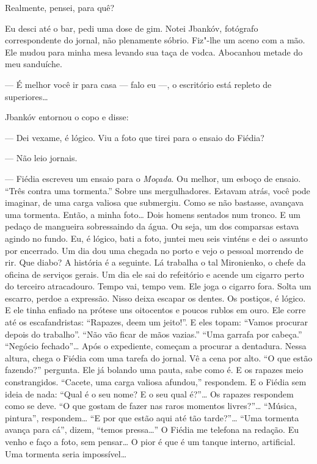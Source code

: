 Realmente, pensei, para quê?

Eu desci até o bar, pedi uma dose de gim. Notei Jbankóv, fotógrafo
correspondente do jornal, não plenamente sóbrio. Fiz"-lhe um aceno com a
mão. Ele mudou para minha mesa levando sua taça de vodca. Abocanhou
metade do meu sanduíche.

--- É melhor você ir para casa --- falo eu ---, o escritório está
repleto de superiores\ldots{}

Jbankóv entornou o copo e disse:

--- Dei vexame, é lógico. Viu a foto que tirei para o ensaio do Fiédia?

--- Não leio jornais.

--- Fiédia escreveu um ensaio para o \emph{Moçada}. Ou melhor, um esboço
de ensaio. ``Três contra uma tormenta.'' Sobre uns
mergulhadores. Estavam atrás, você pode imaginar, de uma carga valiosa
que submergiu. Como se não bastasse, avançava uma tormenta. Então, a
minha foto\ldots{} Dois homens sentados num tronco. E um pedaço de mangueira
sobressaindo da água. Ou seja, um dos comparsas estava agindo no fundo.
Eu, é lógico, bati a foto, juntei meu seis vinténs e dei o assunto por
encerrado. Um dia dou uma chegada no porto e vejo o pessoal morrendo de
rir. Que diabo? A história é a seguinte. Lá trabalha o tal Mironienko, o
chefe da oficina de serviços gerais. Um dia ele sai do refeitório e
acende um cigarro perto do terceiro atracadouro. Tempo vai, tempo vem.
Ele joga o cigarro fora. Solta um escarro, perdoe a expressão. Nisso
deixa escapar os dentes. Os postiços, é lógico. E ele tinha enfiado na
prótese uns oitocentos e poucos rublos em ouro. Ele corre até os
escafandristas: ``Rapazes, deem um jeito!''. E eles topam: ``Vamos
procurar depois do trabalho''. ``Não vão ficar de mãos vazias.'' ``Uma
garrafa por cabeça.'' ``Negócio fechado''\ldots{} Após o expediente, começam
a procurar a dentadura. Nessa altura, chega o Fiédia com uma tarefa do
jornal. Vê a cena por alto. ``O que estão fazendo?'' pergunta. Ele já
bolando uma pauta, sabe como é. E os rapazes meio constrangidos.
``Cacete, uma carga valiosa afundou,'' respondem. E o Fiédia sem ideia de
nada: ``Qual é o seu nome? E o seu qual é?''\ldots{} Os rapazes respondem
como se deve. ``O que gostam de fazer nas raros momentos livres?''\ldots{}
``Música, pintura'', respondem\ldots{} ``E por que estão aqui até tão
tarde?''\ldots{} ``Uma tormenta avança para cá'', dizem, ``temos pressa\ldots{}''
O Fiédia me telefona na redação. Eu venho e faço a foto, sem pensar\ldots{} O
pior é que é um tanque interno, artificial. Uma tormenta seria
impossível\ldots{}

